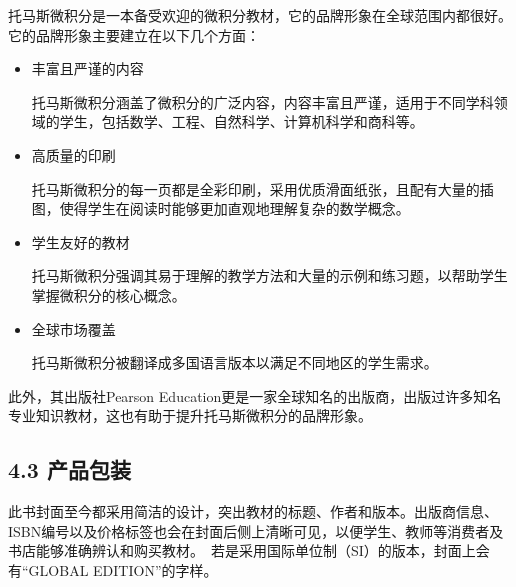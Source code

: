 \documentclass{report}
\begin{document}
托马斯微积分是一本备受欢迎的微积分教材，它的品牌形象在全球范围内都很好。它的品牌形象主要建立在以下几个方面：

\begin{itemize}
    \item 丰富且严谨的内容

          托马斯微积分涵盖了微积分的广泛内容，内容丰富且严谨，适用于不同学科领域的学生，包括数学、工程、自然科学、计算机科学和商科等。

    \item 高质量的印刷

          托马斯微积分的每一页都是全彩印刷，采用优质滑面纸张，且配有大量的插图，使得学生在阅读时能够更加直观地理解复杂的数学概念。

    \item 学生友好的教材

          托马斯微积分强调其易于理解的教学方法和大量的示例和练习题，以帮助学生掌握微积分的核心概念。

    \item 全球市场覆盖

          托马斯微积分被翻译成多国语言版本以满足不同地区的学生需求。
\end{itemize}

此外，其出版社Pearson Education更是一家全球知名的出版商，出版过许多知名专业知识教材，这也有助于提升托马斯微积分的品牌形象。

\subsection*{4.3 产品包装}

此书封面至今都采用简洁的设计，突出教材的标题、作者和版本。出版商信息、ISBN编号以及价格标签也会在封面后侧上清晰可见，以便学生、教师等消费者及书店能够准确辨认和购买教材。 若是采用国际单位制（SI）的版本，封面上会有“GLOBAL EDITION”的字样。
\end{document}
